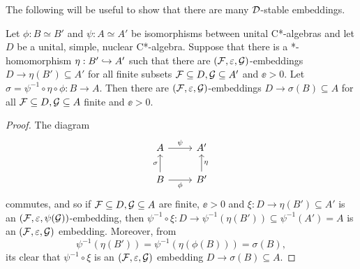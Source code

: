 \documentclass[12pt]{amsart}
\begin{document}
The following will be useful to show that there are many $\mathcal{D}$-stable embeddings.

\begin{lemma}\label{conjugations}
    Let $\phi: B \simeq B'$ and $\psi: A \simeq A'$ be isomorphisms between unital C*-algebras and let $D$ be a unital, simple, nuclear C*-algebra. Suppose that there is a *-homomorphism $\eta: B' \hookrightarrow A'$ such that there are $(\mathcal{F},\varepsilon,\mathcal{G})$-embeddings $D \to \eta(B') \subseteq A'$ for all finite subsets $\mathcal{F} \subseteq D, \mathcal{G} \subseteq A'$ and $\ee > 0$. Let $\sigma = \psi^{-1} \circ \eta \circ \phi: B \to A$. Then there are $(\mathcal{F},\varepsilon,\mathcal{G})$-embeddings $D \to \sigma(B) \subseteq A$ for all $\mathcal{F} \subseteq D, \mathcal{G} \subseteq A$ finite and $\ee > 0$. 
      \begin{proof}
      The diagram
      \begin{equation}
      \begin{tikzcd}
A \arrow[r, "\psi"]                      & A'                    \\
B \arrow[u, "\sigma"] \arrow[r, "\phi"'] & B' \arrow[u, "\eta"']
\end{tikzcd}
      \end{equation}
      commutes, and so if $\mathcal{F} \subseteq D, \mathcal{G} \subseteq A$ are finite, $\ee > 0$ and $\xi: D \to \eta(B') \subseteq A'$ is an $(\mathcal{F},\varepsilon,\psi(\mathcal{G}))$-embedding, then $\psi^{-1} \circ \xi: D \to \psi^{-1}(\eta(B')) \subseteq \psi^{-1}(A') = A$ is an $(\mathcal{F},\varepsilon,\mathcal{G})$ embedding.  Moreover, from
      \begin{equation}
      \psi^{-1}(\eta(B')) = \psi^{-1}(\eta(\phi(B))) = \sigma(B),
      \end{equation}
      its clear that $\psi^{-1} \circ \xi$ is an $(\mathcal{F},\varepsilon,\mathcal{G})$ embedding $D \to \sigma(B) \subseteq A$.

\end{proof}
\end{lemma}
\end{document}
